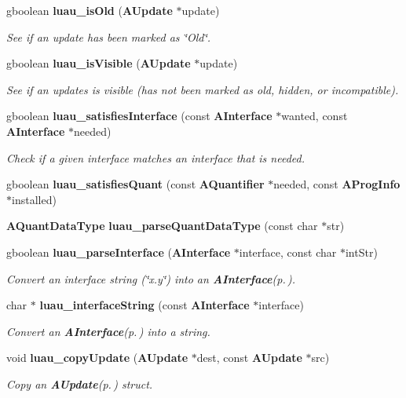 \begin{CompactItemize}
gboolean {\bf luau\_\-is\-Old} ({\bf AUpdate} $\ast$update)
\begin{CompactList}\small\item\em See if an update has been marked as \char`\"{}Old\char`\"{}. \item\end{CompactList}\item 
gboolean {\bf luau\_\-is\-Visible} ({\bf AUpdate} $\ast$update)
\begin{CompactList}\small\item\em See if an updates is visible (has not been marked as old, hidden, or incompatible). \item\end{CompactList}\item 
gboolean {\bf luau\_\-satisfies\-Interface} (const {\bf AInterface} $\ast$wanted, const {\bf AInterface} $\ast$needed)
\begin{CompactList}\small\item\em Check if a given interface matches an interface that is needed. \item\end{CompactList}\item 
gboolean {\bf luau\_\-satisfies\-Quant} (const {\bf AQuantifier} $\ast$needed, const {\bf AProg\-Info} $\ast$installed)
\item 
{\bf AQuant\-Data\-Type} {\bf luau\_\-parse\-Quant\-Data\-Type} (const char $\ast$str)
\item 
gboolean {\bf luau\_\-parse\-Interface} ({\bf AInterface} $\ast$interface, const char $\ast$int\-Str)
\begin{CompactList}\small\item\em Convert an interface string (\char`\"{}x.y\char`\"{}) into an {\bf AInterface}{\rm (p.\,\pageref{structAInterface})}. \item\end{CompactList}\item 
char $\ast$ {\bf luau\_\-interface\-String} (const {\bf AInterface} $\ast$interface)
\begin{CompactList}\small\item\em Convert an {\bf AInterface}{\rm (p.\,\pageref{structAInterface})} into a string. \item\end{CompactList}\item 
void {\bf luau\_\-copy\-Update} ({\bf AUpdate} $\ast$dest, const {\bf AUpdate} $\ast$src)
\begin{CompactList}\small\item\em Copy an {\bf AUpdate}{\rm (p.\,\pageref{structAUpdate})} struct. \item\end{CompactList}\item 

\end{CompactItemize}
